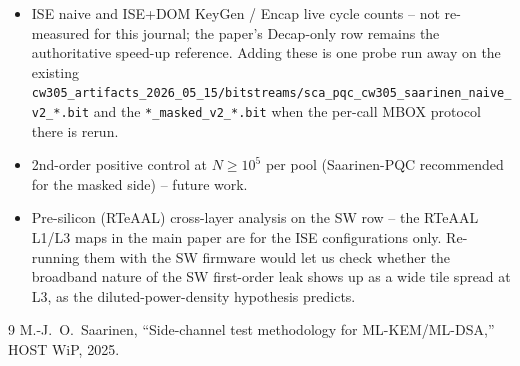 \documentclass[11pt]{article}
\begin{document}
\begin{itemize}
\item ISE naive and ISE+DOM KeyGen / Encap live cycle counts -- not
re-measured for this journal; the paper's Decap-only row remains the
authoritative speed-up reference. Adding these is one probe run away on
the existing \texttt{cw305\_artifacts\_2026\_05\_15/bitstreams/sca\_pqc\_cw305\_saarinen\_naive\_v2\_*.bit}
and the \texttt{*\_masked\_v2\_*.bit} when the per-call MBOX protocol there is rerun.
\item 2nd-order positive control at $N{\geq}10^5$ per pool (Saarinen-PQC
recommended for the masked side) -- future work.
\item Pre-silicon (RTeAAL) cross-layer analysis on the SW row -- the
RTeAAL L1/L3 maps in the main paper are for the ISE configurations only.
Re-running them with the SW firmware would let us check whether the
broadband nature of the SW first-order leak shows up as a wide tile
spread at L3, as the diluted-power-density hypothesis predicts.
\end{itemize}


\begin{thebibliography}{9}
 M.-J.~O.~Saarinen, ``Side-channel test methodology for ML-KEM/ML-DSA,'' HOST WiP, 2025.
\end{thebibliography}
\end{document}
